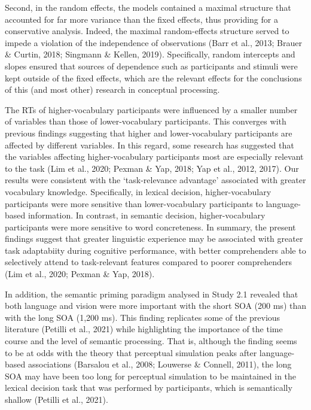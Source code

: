 \documentclass[
  12pt,
  man,floatsintext]{apa7}
\begin{document}
Second, in the random effects, the models contained a maximal structure that accounted for far more variance than the fixed effects, thus providing for a conservative analysis. Indeed, the maximal random-effects structure served to impede a violation of the independence of observations (Barr et al., 2013; Brauer \& Curtin, 2018; Singmann \& Kellen, 2019). Specifically, random intercepts and slopes ensured that sources of dependence such as participants and stimuli were kept outside of the fixed effects, which are the relevant effects for the conclusions of this (and most other) research in conceptual processing.

The RTs of higher-vocabulary participants were influenced by a smaller number of variables than those of lower-vocabulary participants. This converges with previous findings suggesting that higher and lower-vocabulary participants are affected by different variables. In this regard, some research has suggested that the variables affecting higher-vocabulary participants most are especially relevant to the task (Lim et al., 2020; Pexman \& Yap, 2018; Yap et al., 2012, 2017). Our results were consistent with the `task-relevance advantage' associated with greater vocabulary knowledge. Specifically, in lexical decision, higher-vocabulary participants were more sensitive than lower-vocabulary participants to language-based information. In contrast, in semantic decision, higher-vocabulary participants were more sensitive to word concreteness. In summary, the present findings suggest that greater linguistic experience may be associated with greater task adaptabiity during cognitive performance, with better comprehenders able to selectively attend to task-relevant features compared to poorer comprehenders (Lim et al., 2020; Pexman \& Yap, 2018).

In addition, the semantic priming paradigm analysed in Study 2.1 revealed that both language and vision were more important with the short SOA (200 ms) than with the long SOA (1,200 ms). This finding replicates some of the previous literature (Petilli et al., 2021) while highlighting the importance of the time course and the level of semantic processing. That is, although the finding seems to be at odds with the theory that perceptual simulation peaks after language-based associations (Barsalou et al., 2008; Louwerse \& Connell, 2011), the long SOA may have been too long for perceptual simulation to be maintained in the lexical decision task that was performed by participants, which is semantically shallow (Petilli et al., 2021).
\end{document}
